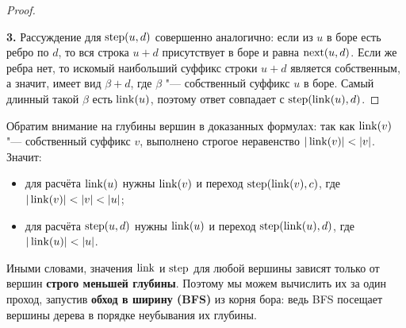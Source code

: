 \begin{proof}
\begin{center}
    \end{center}

    \textbf{3.} Рассуждение для $\operatorname{step}(u, d)$ совершенно аналогично: если из $u$ в боре есть ребро по $d$, то вся строка $u + d$ присутствует в боре и равна $\operatorname{next}(u, d)$. Если же ребра нет, то искомый наибольший суффикс строки $u + d$ является собственным, а значит, имеет вид $\beta + d$, где $\beta$ "--- собственный суффикс $u$ в боре. Самый длинный такой $\beta$ есть $\operatorname{link}(u)$, поэтому ответ совпадает с $\operatorname{step}(\operatorname{link}(u), d)$.
\end{proof}

Обратим внимание на глубины вершин в доказанных формулах: так как $\operatorname{link}(v)$ "--- собственный суффикс $v$, выполнено строгое неравенство $|\operatorname{link}(v)| < |v|$. Значит:
\begin{itemize}
    \item для расчёта $\operatorname{link}(u)$ нужны $\operatorname{link}(v)$ и переход $\operatorname{step}(\operatorname{link}(v), c)$, где $|\operatorname{link}(v)| < |v| < |u|$;
    \item для расчёта $\operatorname{step}(u, d)$ нужны $\operatorname{link}(u)$ и переход $\operatorname{step}(\operatorname{link}(u), d)$, где $|\operatorname{link}(u)| < |u|$.
\end{itemize}
Иными словами, значения $\operatorname{link}$ и $\operatorname{step}$ для любой вершины зависят только от вершин \textbf{строго меньшей глубины}. Поэтому мы можем вычислить их за один проход, запустив \textbf{обход в ширину (BFS)} из корня бора: ведь BFS посещает вершины дерева в порядке неубывания их глубины.

